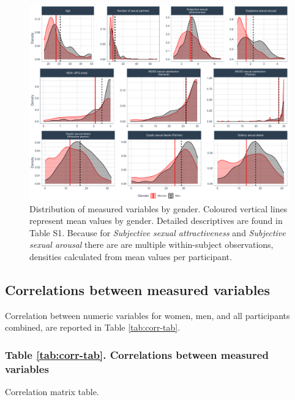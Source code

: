 \documentclass[
  bookmarksnumbered]{article}
\begin{document}
\begin{figure}
\centering
\includegraphics{Sexual_Desire_Arousal_anonymous_files/figure-latex/density-plot-1.pdf}
\caption{\label{fig:density-plot}Distribution of measured variables by gender. Coloured vertical lines represent mean values by gender. Detailed descriptives are found in Table S1. Because for \emph{Subjective sexual attractiveness} and \emph{Subjective sexual arousal} there are are multiple within-subject observations, densities calculated from mean values per participant.}
\end{figure}

\subsection{Correlations between measured variables}\label{correlations-between-measured-variables}

Correlation between numeric variables for women, men, and all participants combined, are reported in Table \ref{tab:corr-tab}.

\subsubsection{Table \ref{tab:corr-tab}. Correlations between measured variables}\label{table-reftabcorr-tab.-correlations-between-measured-variables}

Correlation matrix table.
\end{document}
